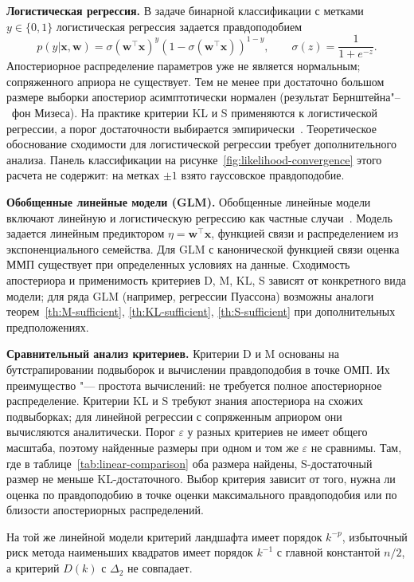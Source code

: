 \textbf{Логистическая регрессия.} В задаче бинарной классификации с метками $y \in \{0, 1\}$ логистическая регрессия задается правдоподобием
\begin{equation}
p(y | \mathbf{x}, \mathbf{w}) = \sigma(\mathbf{w}^\top \mathbf{x})^y (1 - \sigma(\mathbf{w}^\top \mathbf{x}))^{1-y}, \qquad \sigma(z) = \frac{1}{1 + e^{-z}}.
\end{equation}
Апостериорное распределение параметров уже не является нормальным; сопряженного априора не существует. Тем не менее при достаточно большом размере выборки апостериор асимптотически нормален (результат Бернштейна"--~фон Мизеса). На практике критерии KL и S применяются к логистической регрессии, а порог достаточности выбирается эмпирически~\cite{motrenko2014}. Теоретическое обоснование сходимости для логистической регрессии требует дополнительного анализа. Панель классификации на рисунке~\ref{fig:likelihood-convergence} этого расчета не содержит: на метках $\pm 1$ взято гауссовское правдоподобие.

\textbf{Обобщенные линейные модели (GLM).} Обобщенные линейные модели включают линейную и логистическую регрессию как частные случаи~\cite{mccullagh1989generalized}. Модель задается линейным предиктором $\eta = \mathbf{w}^\top \mathbf{x}$, функцией связи и распределением из экспоненциального семейства. Для GLM с канонической функцией связи оценка ММП существует при определенных условиях на данные. Сходимость апостериора и применимость критериев D, M, KL, S зависят от конкретного вида модели; для ряда GLM (например, регрессии Пуассона) возможны аналоги теорем~\ref{th:M-sufficient}, \ref{th:KL-sufficient}, \ref{th:S-sufficient} при дополнительных предположениях.

\textbf{Сравнительный анализ критериев.} Критерии D и M основаны на бутстрапировании подвыборок и вычислении правдоподобия в точке ОМП. Их преимущество "--- простота вычислений: не требуется полное апостериорное распределение. Критерии KL и S требуют знания апостериора на схожих подвыборках; для линейной регрессии с сопряженным априором они вычисляются аналитически. Порог $\varepsilon$ у разных критериев не имеет общего масштаба, поэтому найденные размеры при одном и том же $\varepsilon$ не сравнимы. Там, где в таблице~\ref{tab:linear-comparison} оба размера найдены, S-достаточный размер не меньше KL-достаточного. Выбор критерия зависит от того, нужна ли оценка по правдоподобию в точке оценки максимального правдоподобия или по близости апостериорных распределений.

На той же линейной модели критерий ландшафта имеет порядок $k^{-p}$, избыточный риск метода наименьших квадратов имеет порядок $k^{-1}$ с главной константой $n/2$, а критерий $D(k)$ с $\Delta_2$ не совпадает.


